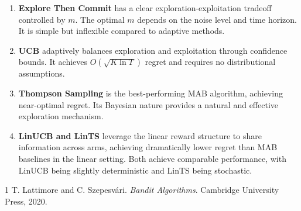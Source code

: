 \documentclass[11pt]{article}
\begin{document}
\begin{enumerate}
    \item \textbf{Explore Then Commit} has a clear exploration-exploitation tradeoff controlled by $m$. The optimal $m$ depends on the noise level and time horizon. It is simple but inflexible compared to adaptive methods.
    
    \item \textbf{UCB} adaptively balances exploration and exploitation through confidence bounds. It achieves $O(\sqrt{K \ln T})$ regret and requires no distributional assumptions.
    
    \item \textbf{Thompson Sampling} is the best-performing MAB algorithm, achieving near-optimal regret. Its Bayesian nature provides a natural and effective exploration mechanism.
    
    \item \textbf{LinUCB and LinTS} leverage the linear reward structure to share information across arms, achieving dramatically lower regret than MAB baselines in the linear setting. Both achieve comparable performance, with LinUCB being slightly deterministic and LinTS being stochastic.
\end{enumerate}

\begin{thebibliography}{1}
 T. Lattimore and C. Szepesv\'{a}ri. \textit{Bandit Algorithms}. Cambridge University Press, 2020.
\end{thebibliography}
\end{document}
